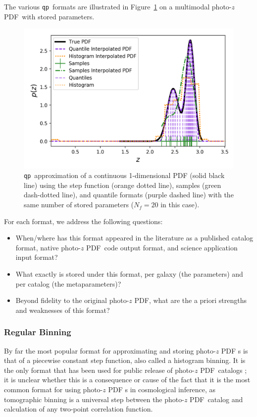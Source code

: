 \documentclass[\docopts]{\docclass}
\newcommand{\qp}{\texttt{qp}\xspace}
\newcommand{\pz}{photo-$z$ PDF\xspace}
\begin{document}
The various \qp\ formats are illustrated in Figure~\ref{fig:qp} on a multimodal 
\pz\ with stored parameters.
\begin{figure}
  \includegraphics[width=0.9\columnwidth]{figures/demo_pz.png}
  \caption{\qp\ approximation of a continuous 1-dimensional PDF (solid black 
line) using the step function (orange dotted line), samples (green dash-dotted 
line), and quantile formats (purple dashed line) with the same number of stored 
parameters ($N_{f}=20$ in this case).
  \label{fig:qp}}
\end{figure}

For each format, we address the following questions:
\begin{itemize}
  \item When/where has this format appeared in the literature as a published 
catalog format, native \pz\ code output format, and science application input 
format?
  \item What exactly is stored under this format, per galaxy (the parameters) 
and per catalog (the metaparameters)?
  \item Beyond fidelity to the original \pz, what are the a priori strengths 
and weaknesses of this format?
\end{itemize}

\subsubsection{Regular Binning}
\label{sec:bins}

By far the most popular format for approximating and storing \pz s is that of a 
piecewise constant step function, also called a histogram binning.
It is the only format that has been used for public release of \pz\ catalogs 
\citep{tanaka_photometric_2017, sheldon_photometric_2012}; it is unclear 
whether this is a consequence or cause of the fact that it is the most common 
format for using \pz s in cosmological inference, as tomographic binning is a 
universal step between the \pz\ catalog and calculation of any two-point 
correlation function.
\end{document}
